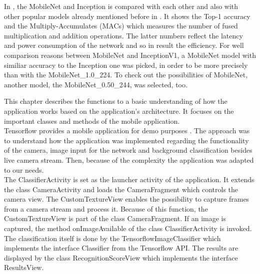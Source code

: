 In , the MobileNet and Inception is compared with each other and also with other popular models already mentioned before in . It shows the Top-1 accuracy and the Multiply-Accumulates (MACs) which measures the number of fused multiplication and addition operations. The latter numbers reflect the latency and power consumption of the network and so in result the efficiency. For well comparison reasons between MobileNet and InceptionV1, a MobileNet model with similiar accuracy to the Inception one was picked, in order to be more precisely than with the MobileNet\_1.0\_224. To check out the possibilities of MobileNet, another model, the MobileNet\_0.50\_244, was selected, too.


This chapter describes the functions to a basic understanding of how the application works based on the application's architecture. It focuses on the important classes and methods of the mobile application. \\
Tensorflow provides a mobile application for demo purposes \citep{TensorflowDemo}. The approach was to understand how the application was implemented regarding the functionality of the camera, image input for the network and background classification besides live camera stream. Then, because of the complexity the application was adapted to our needs.  \\

The ClassifierActivity is set as the launcher activity of the application. It extends the class CameraActivity and loads the CameraFragment which controls the camera view. The CustomTextureView enables the possibility to capture frames from a camera stream and process it. Because of this function, the CustomTextureView is part of the class CameraFragment. If an image is captured, the method onImageAvailable of the class ClassifierActivity is invoked. The classification itself is done by the TensorflowImageClassifier which implements the interface Classifier from the Tensorflow API. The results are displayed by the class RecognitionScoreView which implements the interface ResultsView.